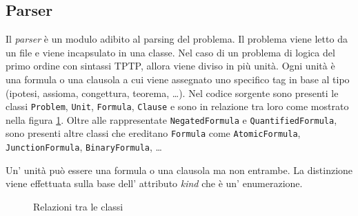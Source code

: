 \subsection{Parser}
Il \emph{parser} è un modulo adibito al parsing del problema. Il problema viene letto da un file e viene incapsulato in una classe.
Nel caso di un problema di logica del primo ordine con sintassi TPTP, allora viene diviso in più unità.
Ogni unità è una formula o una clausola a cui viene assegnato uno specifico tag in base al tipo (ipotesi, assioma, congettura, teorema, \dots).
Nel codice sorgente sono presenti le classi \verb|Problem|, \verb|Unit|, \verb|Formula|, \verb|Clause| e sono in relazione tra loro come mostrato nella figura \ref{fig:relazioni-classi}.
Oltre alle rappresentate \verb|NegatedFormula| e \verb|QuantifiedFormula|, sono presenti altre classi che ereditano \verb|Formula| come
\verb|AtomicFormula|, \verb|JunctionFormula|, \verb|BinaryFormula|, \dots
\begin{remark}
    Un' unità può essere una formula o una clausola ma non entrambe. La distinzione viene effettuata sulla base dell'
    attributo \emph{kind} che è un' enumerazione.
\end{remark}
\vspace{.3cm}
\begin{figure}[H]
    \caption{Relazioni tra le classi}\label{fig:relazioni-classi}
\end{figure}
